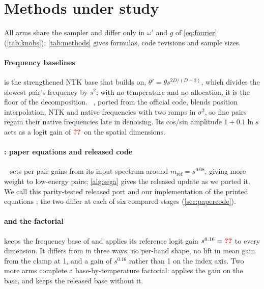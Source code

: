 \section{Methods under study}\label{sec:methods}

All arms share the sampler and differ only in $\omega'$ and $g$ of \cref{eq:fourier} (\cref{tab:knobs}); \cref{tab:methods} gives formulas, code revisions and sample sizes.

\paragraph{Frequency baselines}
\ntk{} is the strengthened NTK base that \sega{} builds on, $\theta'=\theta s^{2D/(D-2)}$, which divides the slowest pair's frequency by $s^2$; with no temperature and no allocation, it is the floor of the decomposition. \dype~\citep{issachar2025dype}, ported from the official code, blends position interpolation, NTK and native frequencies with two ramps in $\sigma^2$, so fine pairs regain their native frequencies late in denoising. Its cos/sin amplitude $1+0.1\ln s$ acts as a logit gain of $\N{c@dypegain}$ on the spatial dimensions.

\paragraph{\sega: paper equations and released code}
\sega~\citep{sega2026} sets per-pair gains from its input spectrum around $m_{\mathrm{ref}}=s^{0.08}$, giving more weight to low-energy pairs; \cref{alg:sega} gives the released update as we ported it. We call this parity-tested released port \segaofficial{} and our implementation of the printed equations \segapaper; the two differ at each of six compared stages (\cref{sec:papercode}).

\paragraph{\tempsb{} and the factorial}
\tempsb{} keeps the frequency base of \segaofficial{} and applies its reference logit gain $s^{0.16}=\N{c@segatemp}$ to every dimension. It differs from \segaofficial{} in three ways: no per-band shape, no lift in mean gain from the clamp at 1, and a gain of $s^{0.16}$ rather than 1 on the index axis. Two more arms complete a base-by-temperature factorial: \ntktemp{} applies the gain on the \ntk{} base, and \segabase{} keeps the released base without it.

